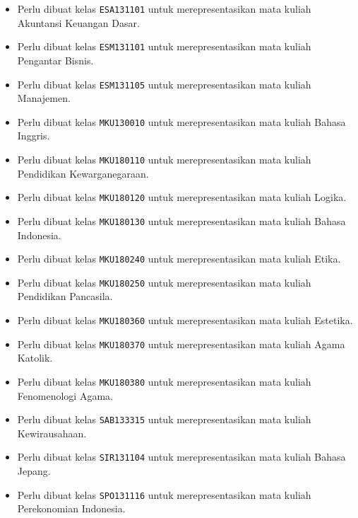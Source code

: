 \begin{enumerate}
\begin{itemize}
		\item Perlu dibuat kelas \texttt{ESA131101} untuk merepresentasikan mata kuliah Akuntansi Keuangan Dasar.
		\item Perlu dibuat kelas \texttt{ESM131101} untuk merepresentasikan mata kuliah Pengantar Bisnis.
		\item Perlu dibuat kelas \texttt{ESM131105} untuk merepresentasikan mata kuliah Manajemen.
		\item Perlu dibuat kelas \texttt{MKU130010} untuk merepresentasikan mata kuliah Bahasa Inggris.
		\item Perlu dibuat kelas \texttt{MKU180110} untuk merepresentasikan mata kuliah Pendidikan Kewarganegaraan.
		\item Perlu dibuat kelas \texttt{MKU180120} untuk merepresentasikan mata kuliah Logika.
		\item Perlu dibuat kelas \texttt{MKU180130} untuk merepresentasikan mata kuliah Bahasa Indonesia.
		\item Perlu dibuat kelas \texttt{MKU180240} untuk merepresentasikan mata kuliah Etika.
		\item Perlu dibuat kelas \texttt{MKU180250} untuk merepresentasikan mata kuliah Pendidikan Pancasila.
		\item Perlu dibuat kelas \texttt{MKU180360} untuk merepresentasikan mata kuliah Estetika.
		\item Perlu dibuat kelas \texttt{MKU180370} untuk merepresentasikan mata kuliah Agama Katolik.
		\item Perlu dibuat kelas \texttt{MKU180380} untuk merepresentasikan mata kuliah Fenomenologi Agama.
		\item Perlu dibuat kelas \texttt{SAB133315} untuk merepresentasikan mata kuliah Kewirausahaan.
		\item Perlu dibuat kelas \texttt{SIR131104} untuk merepresentasikan mata kuliah Bahasa Jepang.
		\item Perlu dibuat kelas \texttt{SPO131116} untuk merepresentasikan mata kuliah Perekonomian Indonesia.
	\end{itemize}
	

\end{enumerate}
